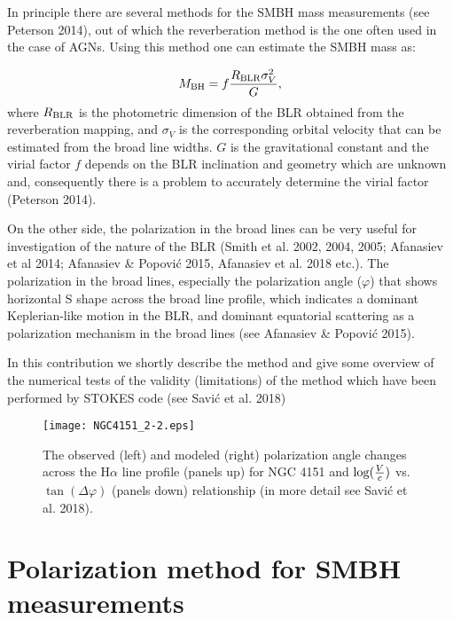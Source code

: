 \documentclass{iau}
\begin{document}
In principle there are several methods for the SMBH mass measurements 
(see Peterson 2014), out of which the reverberation
method is the one often used in the case of AGNs. Using this method one can estimate 
the SMBH mass as:

$$M_{\rm BH}=f{R_{\rm BLR} \sigma_V^2\over G},$$
where $R_{\rm BLR}$ is the photometric dimension of the BLR  obtained from 
the reverberation mapping, and $\sigma_V$ is the corresponding  orbital velocity that can be
estimated from the broad line widths. $G$ is the gravitational constant and
the virial factor $f$ depends on the BLR inclination
and geometry which are unknown and, consequently there is a problem to accurately  determine the 
virial factor (Peterson 2014).

On the other side, the polarization in the broad lines can be very useful for 
investigation of the nature of the BLR (Smith et al. 2002, 2004, 2005;
Afanasiev et al 2014; Afanasiev \& Popovi\'c 2015, Afanasiev et al. 2018 etc.).
The polarization in the broad lines, especially the polarization angle ($\varphi$) 
 that  shows horizontal S shape across the broad line profile, which indicates a
dominant Keplerian-like motion in the BLR, and dominant equatorial scattering as a 
polarization mechanism in the broad lines (see Afanasiev \& Popovi\'c 2015).

In this contribution we shortly describe the method and give some overview of the 
numerical tests of the validity (limitations) of the method 
which have been performed by STOKES code (see Savi\'c et al. 2018)


\begin{figure}[b]
\begin{center}
 \texttt{[image: NGC4151\_2-2.eps]} 
 \caption{The observed (left) and modeled (right) polarization angle changes 
 across the H$\alpha$ line profile (panels up) 
 for NGC 4151 and $\log({V\over c})$ vs. $\tan(\Delta\varphi)$  (panels down) relationship 
(in more detail see Savi\'c et al. 2018).}
   \label{fig1}
\end{center}
\end{figure}

\section{Polarization method for SMBH measurements}
\end{document}
